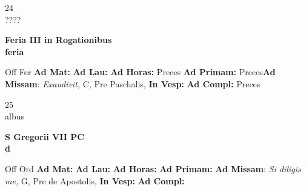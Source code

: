 \documentclass[10pt, openany]{book}
\begin{document}
    \begin{center}
        \begin{minipage}{3.5in}
            \vspace{2em}
            \begin{minipage}{0.5in}
                {\Huge 24} \\
                {\normalsize ????}
            \end{minipage}
            \begin{minipage}{3.0in}
                \textbf{ \large Feria III in Rogationibus \\
                \textnormal{\normalsize feria}}

            \end{minipage}
            \begin{justify}Off Fer
                \textbf{Ad Mat: }
                \textbf{Ad Lau: }
                \textbf{Ad Horas: }Preces
                \textbf{Ad Primam: }Preces\textbf{Ad Missam}: \textit{Exaudivit,} C, Pre Paschalis, 
                \textbf{In Vesp: }
                \textbf{Ad Compl: }Preces
            \end{justify}
        \end{minipage}
    \end{center}

    \begin{center}
        \begin{minipage}{3.5in}
            \vspace{2em}
            \begin{minipage}{0.5in}
                {\Huge 25} \\
                {\normalsize albus}
            \end{minipage}
            \begin{minipage}{3.0in}
                \textbf{ \large S Gregorii VII PC \\
                \textnormal{\normalsize d}}

            \end{minipage}
            \begin{justify}Off Ord
                \textbf{Ad Mat: }
                \textbf{Ad Lau: }
                \textbf{Ad Horas: }
                \textbf{Ad Primam: }\textbf{Ad Missam}: \textit{Si diligis me,} G, Pre de Apostolis, 
                \textbf{In Vesp: }
                \textbf{Ad Compl: }
            \end{justify}
        \end{minipage}
    \end{center}
\end{document}
